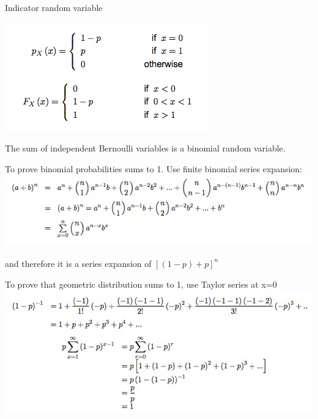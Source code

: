 \documentclass{examnotes}
\begin{document}

\vspace{6pt}

Indicator random variable  %

\includegraphics[scale=0.6]{./img/2ber.jpg}



The sum of independent Bernoulli variables is a binomial random variable. 

To prove binomial probabilities sums to 1. Use finite binomial series expansion:
\includegraphics[scale=0.7]{./img/2ber2.jpg}
\vspace{-10pt}

and therefore it is a series expansion of $[(1-p)+p]^n$

\vspace{6pt}

To prove that geometric distribution sums to 1, use Taylor series at x=0
\includegraphics[scale=0.7]{./img/2geo.jpg}
\end{document}
